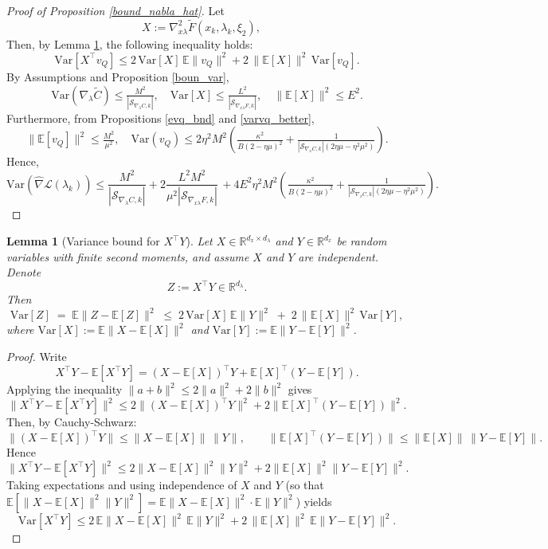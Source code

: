 \documentclass[11pt, twoside]{report}
\newtheorem{lemma}[theorem]{Lemma}
\begin{document}
\begin{proof}[Proof of Proposition \ref{bound_nabla_hat}]
Let 
\[
X := \nabla_{x \lambda}^2 \tilde{F}(x_k,\lambda_k,\xi_2), \quad 
\]
Then, by Lemma \ref{var_lemma_appendix}, the following inequality holds:
\[
\mathrm{Var}[X^\top v_Q]
\leq 2 \, \mathrm{Var}[X] \, \mathbb{E}\|v_Q\|^2 
+ 2 \, \|\mathbb{E}[X]\|^2 \, \mathrm{Var}[v_Q].
\]
By Assumptions and Proposition \ref{boun_var},
\[
\mathrm{Var}(\nabla_\lambda \tilde{C}) \leq \tfrac{M^2}{|\mathcal{S}_{\nabla_\lambda C,k}|}, 
\quad \mathrm{Var}[X] \leq \tfrac{L^2}{|\mathcal{S}_{\nabla_{x\lambda} F,k}|}, 
\quad \|\mathbb{E}[X]\|^2 \leq E^2.
\]
Furthermore, from Propositions \ref{evq_bnd} and \ref{varvq_better},
\[
\|\mathbb{E}[v_Q]\|^2 \leq \tfrac{M^2}{\mu^2}, 
\quad \mathrm{Var}(v_Q) \leq 2\eta^2 M^2 \left( \tfrac{\kappa^2}{B (2 - \eta \mu)^2} 
+ \tfrac{1}{|\mathcal{S}_{\nabla_x C,k}|(2\eta \mu - \eta^2 \mu^2)} \right).
\]
Hence,
\[
\mathrm{Var}(\widehat{\nabla}\mathcal{L}(\lambda_k)) 
\leq \frac{M^2}{|\mathcal{S}_{\nabla_\lambda C,k}|} 
+ 2 \frac{L^2 M^2}{\mu^2|\mathcal{S}_{\nabla_{x\lambda} F,k}|} \, 
+ 4E^2\eta^2 M^2 \left( \tfrac{\kappa^2}{B (2 - \eta \mu)^2} 
+ \tfrac{1}{|\mathcal{S}_{\nabla_x C,k}|(2\eta \mu - \eta^2 \mu^2)} \right).
\]
\end{proof}


\begin{lemma}[Variance bound for $X^\top Y$] \label{var_lemma_appendix}
\label{lem:var_XtY}
Let \(X\in\mathbb{R}^{d_x\times d_\lambda}\) and \(Y\in\mathbb{R}^{d_x}\) be random variables with finite second moments, and assume \(X\) and \(Y\) are independent. Denote
\[
Z := X^\top Y \in \mathbb{R}^{d_\lambda}.
\]
Then
\[
\mathrm{Var}[Z] \;=\; \mathbb{E}\big\|Z - \mathbb{E}[Z]\big\|^2
\;\le\; 2\,\mathrm{Var}[X] \,\mathbb{E}\|Y\|^2
\;+\; 2\,\big\|\mathbb{E}[X]\big\|^2 \,\mathrm{Var}[Y],
\]
where \(\mathrm{Var}[X]:=\mathbb{E}\|X-\mathbb{E}[X]\|^2\) and \(\mathrm{Var}[Y]:=\mathbb{E}\|Y-\mathbb{E}[Y]\|^2\).
\end{lemma}

\begin{proof}
Write
\[
X^\top Y - \mathbb{E}[X^\top Y] = (X - \mathbb{E}[X])^\top Y + \mathbb{E}[X]^\top (Y - \mathbb{E}[Y]).
\]
Applying the inequality \(\|a+b\|^2 \le 2\|a\|^2 + 2\|b\|^2\) gives
\[
\|X^\top Y - \mathbb{E}[X^\top Y]\|^2
\le 2\|(X-\mathbb{E}[X])^\top Y\|^2 + 2\|\mathbb{E}[X]^\top (Y-\mathbb{E}[Y])\|^2.
\]
Then, by Cauchy-Schwarz:
\[
\|(X-\mathbb{E}[X])^\top Y\| \le \|X-\mathbb{E}[X]\|\,\|Y\|, \qquad
\|\mathbb{E}[X]^\top (Y-\mathbb{E}[Y])\| \le \|\mathbb{E}[X]\|\,\|Y-\mathbb{E}[Y]\|.
\]
Hence
\[
\|X^\top Y - \mathbb{E}[X^\top Y]\|^2
\le 2 \|X-\mathbb{E}[X]\|^2 \|Y\|^2 + 2 \|\mathbb{E}[X]\|^2 \|Y-\mathbb{E}[Y]\|^2.
\]
Taking expectations and using independence of \(X\) and \(Y\) (so that \(\mathbb{E}[\|X-\mathbb{E}[X]\|^2\|Y\|^2] = \mathbb{E}\|X-\mathbb{E}[X]\|^2 \cdot \mathbb{E}\|Y\|^2\)) yields
\[
\mathrm{Var}[X^\top Y]
\le 2\,\mathbb{E}\|X-\mathbb{E}[X]\|^2 \,\mathbb{E}\|Y\|^2
+ 2\,\|\mathbb{E}[X]\|^2 \,\mathbb{E}\|Y-\mathbb{E}[Y]\|^2.
\]
\end{proof}
\end{document}
